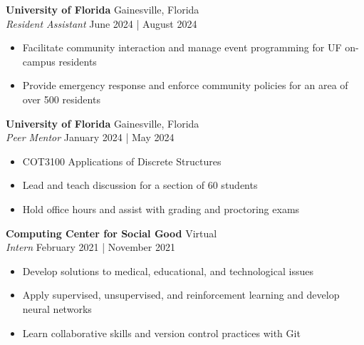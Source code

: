\documentclass[a4paper,9pt]{extarticle}
\begin{document}
\noindent
\textbf{University of Florida} \hfill Gainesville, Florida\\ %
\textit{Resident Assistant} \hfill June 2024 | August 2024%
\begin{itemize}
    \item Facilitate community interaction and manage event programming for UF on-campus residents
    \item Provide emergency response and enforce community policies for an area of over 500 residents
\end{itemize}

\noindent
\textbf{University of Florida} \hfill Gainesville, Florida\\ %
\textit{Peer Mentor} \hfill January 2024 | May 2024%
\begin{itemize}
    \item COT3100 Applications of Discrete Structures
    \item Lead and teach discussion for a section of 60 students
    \item Hold office hours and assist with grading and proctoring exams
\end{itemize}
\textbf{Computing Center for Social Good} \hfill Virtual\\ %
\textit{Intern} \hfill February 2021 | November 2021 %
\begin{itemize}
    \item Develop solutions to medical, educational, and technological issues
    \item Apply supervised, unsupervised, and reinforcement learning and develop neural networks
    \item Learn collaborative skills and version control practices with Git
\end{itemize}

\end{document}
